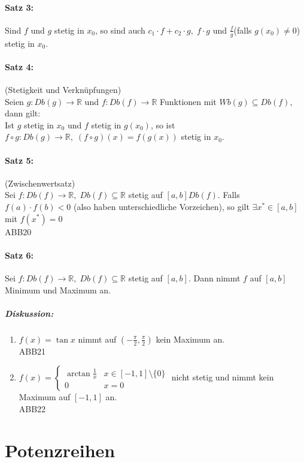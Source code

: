 \paragraph{Satz 3:} Sind $f$ und $g$ stetig in $x_0$, so sind auch $c_1 \cdot f + c_2 \cdot g, \; f\cdot g$ und $\frac{f}{g}$(falls $g(x_0)\not = 0$) stetig in $x_0$.

\paragraph{Satz 4:} (Stetigkeit und Verknüpfungen)\\
Seien $g: Db(g) \to \mathbb{R}$ und $f: Db(f) \to \mathbb{R}$ Funktionen mit $Wb(g)\subseteq Db(f)$, dann gilt:\\
Ist $g$ stetig in $x_0$ und $f$ stetig in $g(x_0)$, so ist $f\circ g:Db(g) \to \mathbb{R}, \; (f\circ g)(x) = f(g(x))$ stetig in $x_0$.

\paragraph{Satz 5:} (Zwischenwertsatz)\\
Sei $f: Db(f) \to \mathbb{R}, \; Db(f)\subseteq \mathbb{R}$ stetig auf $[a,b]  Db(f)$. Falls $f(a) \cdot f(b) < 0$ (also haben unterschiedliche Vorzeichen), so gilt $\exists x^*\in [a,b]$ mit $f(x^*)=0$\\
ABB20
\paragraph{Satz 6:} Sei $f: Db(f) \to \mathbb{R}, \; Db(f) \subseteq \mathbb{R}$ stetig auf $[a,b]$. Dann nimmt $f$ auf $[a,b]$ Minimum und Maximum an.

\subparagraph{Diskussion:}
\begin{enumerate}[label=\alph*.)]
\item $f(x) = \tan x$ nimmt auf $\left( - \frac{\pi}{2}, \frac{\pi}{2}\right)$ kein Maximum an.\\
ABB21
\item $f(x) = \begin{cases}
\arctan \frac{1}{x} & x \in [-1,1]\setminus \{0\}\\
0 & x = 0
\end{cases}$ nicht stetig und nimmt kein Maximum auf $[-1,1]$ an.\\
ABB22
\end{enumerate}

\section{Potenzreihen}
